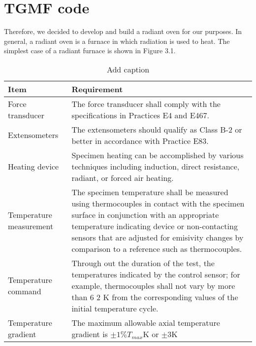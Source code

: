 \section{TGMF code}
Therefore, we decided to develop and build a radiant oven for our purposes. In general, a radiant oven is a furnace in which radiation is used to heat. The simplest case of a radiant furnace is shown in Figure 3.1.

\begin{table}[htbp]
  \centering
  \caption{Add caption}
    \begin{tabular}{p{4cm}p{10cm}}
    \toprule
    Item  & Requirement \\
    \midrule
    Force transducer & The force transducer shall comply with the specifications in Practices E4 and E467. \\
    Extensometers & The extensometers should qualify as Class B-2 or better in accordance with Practice E83. \\
    Heating device & Specimen heating can be accomplished by various techniques including induction, direct resistance, radiant, or forced air heating. \\
    Temperature measurement & The specimen temperature shall be measured using thermocouples in contact with the specimen surface in conjunction with an appropriate temperature indicating device or non-contacting sensors that are adjusted for emisivity changes by comparison to a reference such as thermocouples. \\
    Temperature command & Through out the duration of the test, the temperatures indicated by the control sensor; for example, thermocouples shall not vary by more than 6 2 K from the corresponding values of the initial temperature cycle. \\
    Temperature gradient & The maximum allowable axial temperature gradient is $\pm1\% T_{max}$K or $\pm3$K  \\
    \bottomrule
    \end{tabular}%
  \label{tab:addlabel}%
\end{table}%


